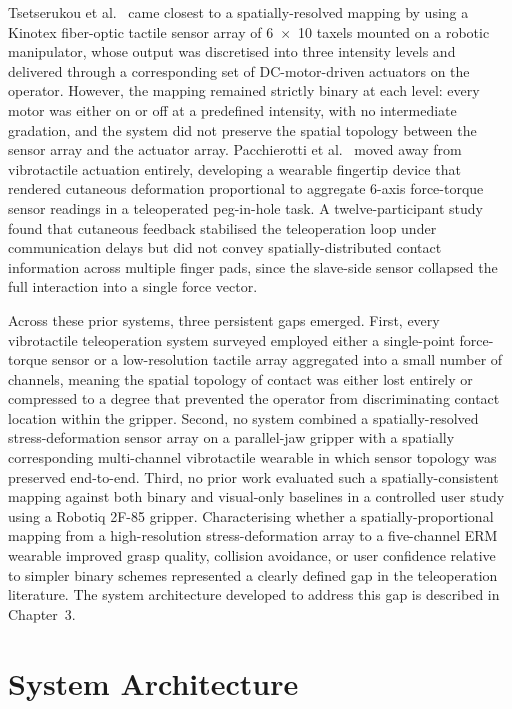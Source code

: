 \documentclass[12pt, a4paper]{report}
\begin{document}
Tsetserukou et al.\ \cite{tsetserukou2010} came closest to a spatially-resolved mapping by using a Kinotex fiber-optic tactile sensor array of 6~$\times$~10 taxels mounted on a robotic manipulator, whose output was discretised into three intensity levels and delivered through a corresponding set of DC-motor-driven actuators on the operator. However, the mapping remained strictly binary at each level: every motor was either on or off at a predefined intensity, with no intermediate gradation, and the system did not preserve the spatial topology between the sensor array and the actuator array. Pacchierotti et al.\ \cite{pacchierotti2015b} moved away from vibrotactile actuation entirely, developing a wearable fingertip device that rendered cutaneous deformation proportional to aggregate 6-axis force-torque sensor readings in a teleoperated peg-in-hole task. A twelve-participant study found that cutaneous feedback stabilised the teleoperation loop under communication delays but did not convey spatially-distributed contact information across multiple finger pads, since the slave-side sensor collapsed the full interaction into a single force vector.

Across these prior systems, three persistent gaps emerged. First, every vibrotactile teleoperation system surveyed employed either a single-point force-torque sensor or a low-resolution tactile array aggregated into a small number of channels, meaning the spatial topology of contact was either lost entirely or compressed to a degree that prevented the operator from discriminating contact location within the gripper. Second, no system combined a spatially-resolved stress-deformation sensor array on a parallel-jaw gripper with a spatially corresponding multi-channel vibrotactile wearable in which sensor topology was preserved end-to-end. Third, no prior work evaluated such a spatially-consistent mapping against both binary and visual-only baselines in a controlled user study using a Robotiq 2F-85 gripper. Characterising whether a spatially-proportional mapping from a high-resolution stress-deformation array to a five-channel ERM wearable improved grasp quality, collision avoidance, or user confidence relative to simpler binary schemes represented a clearly defined gap in the teleoperation literature. The system architecture developed to address this gap is described in Chapter~3.

\chapter{System Architecture}
\end{document}
